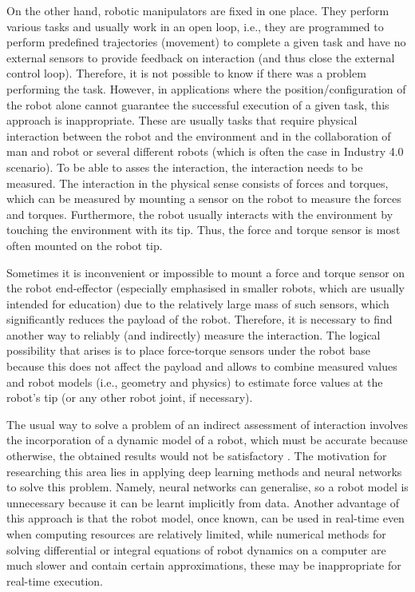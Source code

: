 On the other hand, robotic manipulators are fixed in one place. They perform various tasks and usually work in an open loop, i.e., they are programmed to perform predefined trajectories (movement) to complete a given task and have no external sensors to provide feedback on interaction (and thus close the external control loop). Therefore, it is not possible to know if there was a problem performing the task. However, in applications where the position/configuration of the robot alone cannot guarantee the successful execution of a given task, this approach is inappropriate. These are usually tasks that require physical interaction between the robot and the environment and in the collaboration of man and robot or several different robots (which is often the case in Industry 4.0 scenario). To be able to asses the interaction, the interaction needs to be measured. The interaction in the physical sense consists of forces and torques, which can be measured by mounting a sensor on the robot to measure the forces and torques. Furthermore, the robot usually interacts with the environment by touching the environment with its tip. Thus, the force and torque sensor is most often mounted on the robot tip.

Sometimes it is inconvenient or impossible to mount a force and torque sensor on the robot end-effector (especially emphasised in smaller robots, which are usually intended for education) due to the relatively large mass of such sensors, which significantly reduces the payload of the robot. Therefore, it is necessary to find another way to reliably (and indirectly) measure the interaction. The logical possibility that arises is to place force-torque sensors under the robot base because this does not affect the payload and allows to combine measured values and robot models (i.e., geometry and physics) to estimate force values at the robot's tip (or any other robot joint, if necessary).

The usual way to solve a problem of an indirect assessment of interaction involves the incorporation of a dynamic model of a robot, which must be accurate because otherwise, the obtained results would not be satisfactory \cite{Colome2013}.
The motivation for researching this area lies in applying deep learning methods and neural networks to solve this problem. Namely, neural networks can generalise, so a robot model is unnecessary because it can be learnt implicitly from data. Another advantage of this approach is that the robot model, once known, can be used in real-time even when computing resources are relatively limited, while numerical methods for solving differential or integral equations of robot dynamics on a computer are much slower and contain certain approximations, these may be inappropriate for real-time execution.

